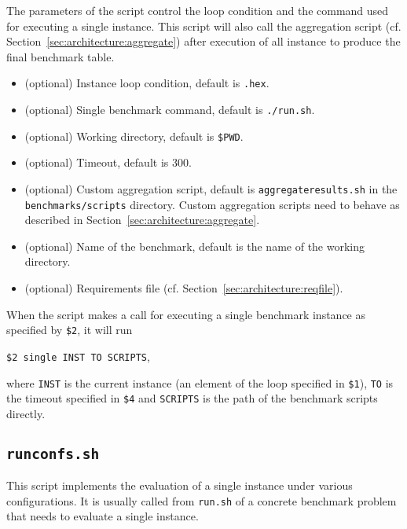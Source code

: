 \documentclass[a4paper]{article}
\begin{document}
		    The parameters of the script control the loop condition
		    and the command used for executing a single instance.
		    This script will also call the aggregation script (cf. Section~\ref{sec:architecture:aggregate})
		    after execution of all instance
		    to produce the final benchmark table.
				
		    \medskip{}
		    \begin{itemize}
				\item[{\tt \$1}:] (optional) Instance loop condition, default is {\tt *.hex}.
				\item[{\tt \$2}:] (optional) Single benchmark command, default is {\tt ./run.sh}.
				\item[{\tt \$3}:] (optional) Working directory, default is {\tt \$PWD}.
				\item[{\tt \$4}:] (optional) Timeout, default is {\tt $300$}.
				\item[{\tt \$5}:] (optional) Custom aggregation script, default is {\tt aggregateresults.sh}
					in the {\tt benchmarks/scripts} directory.
					Custom aggregation scripts need to behave as described in Section~\ref{sec:architecture:aggregate}.
				\item[{\tt \$6}:] (optional) Name of the benchmark, default is the name of the working directory.
				\item[{\tt \$7}:] (optional) Requirements file (cf. Section~\ref{sec:architecture:reqfile}).
		    \end{itemize}
		 
		 	When the script makes a call for executing a single benchmark instance
		 	as specified by {\tt \$2}, it will run
		 	\begin{center}
		 		{\tt \$2 single INST TO SCRIPTS},
		 	\end{center}
		 	where {\tt INST} is the current instance (an element of the loop specified in {\tt \$1}),
		 	{\tt TO} is the timeout specified in {\tt \$4}
		 	and {\tt SCRIPTS} is the path of the benchmark scripts directly.
				
		\subsection{\tt runconfs.sh}
		\label{sec:architecture:runconfs}
		
		    This script implements the evaluation of
		    a single instance under various configurations.
		    It is usually called from {\tt run.sh} of a concrete benchmark problem
		    that needs to evaluate a single instance.
		
\end{document}
